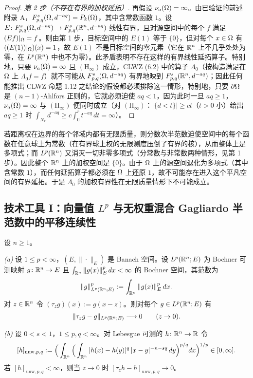 \begin{proof}
\emph{第 2 步（不存在有界的加权延拓）}. 再假设 $\nu_{a}(\Omega)=\infty$。由已验证的前述附录 A，$F^{s}_{p,q}(\Omega,d^{-aq})=P_k(\Omega)$，其中含常数函数 $1$。设 $E\colon F^{s}_{p,q}(\Omega,d^{-aq})\to F^{s}_{p,q}(\mathbb{R}^n,d^{-aq})$ 线性有界，且对源空间中的每个 $f$ 满足 $(Ef)|_\Omega=f$。则由第 1 步，目标空间中的 $E(1)$ 等于 $\{0\}$，但对每个 $x\in\Omega$ 有 $((E(1))|_\Omega)(x)=1$，故 $E(1)$ 不是目标空间的零元素（它在 $\mathbb{R}^n$ 上不几乎处处为零，在 $L^p(\mathbb{R}^n)$ 中也不为零）。此矛盾表明不存在这样的有界线性延拓算子。特别地，只要 $\nu_{a}(\Omega)=\infty$ 且 $\mathrm{(H_{\infty})}$ 成立，CLWZ (6.2) 中的算子 $\Lambda_0$（按构造满足在 $\Omega$ 上 $\Lambda_0f=f$）就不可能从 $F^{s}_{p,q}(\Omega,d^{-aq})$ 有界地映到 $F^{s}_{p,q}(\mathbb{R}^n,d^{-aq})$；因此任何能推出 CLWZ 命题 1.12 之结论的假设都必须排除这一情形，特别地，只要 $\partial\Omega$ 是 $(n-1)$-Ahlfors 正则的，它就必须迫使 $aq<1$，因为此时一旦 $aq\ge1$，$\nu_{a}(\Omega)=\infty$ 与 $\mathrm{(H_{\infty})}$ 便同时成立（对 $\mathrm{(H_{\infty})}$：$|\{d<t\}|\ge ct$（$t>0$ 小）给出 $aq\ge1$ 时 $\int_{N_r}d^{-aq}\ge c\int_0^rt^{-aq}\,dt=\infty$）。
\end{proof}

\begin{remark}[直觉]
若距离权在边界的每个邻域内都有无限质量，则分数次半范数迫使空间中的每个函数在任意球上为常数（在有界球上权的无限测度压倒了有界的核），从而整体上是多项式；而 $L^p(\mathbb{R}^n)$ 又消灭一切非零多项式（分常数与非常数两种情形，见第 1 步）。因此整个 $\mathbb{R}^n$ 上的加权空间是 $\{0\}$。由于 $\Omega$ 上的源空间退化为多项式（其中含常数 $1$），而任何延拓算子都必须在 $\Omega$ 上还原 $1$，故不可能存在进入这个平凡空间的有界延拓。于是 $\Lambda_0$ 的加权有界性在无限质量情形下不可能成立。
\end{remark}

\subsection{技术工具 I：向量值 \texorpdfstring{$L^p$}{Lp} 与无权重混合 Gagliardo 半范数中的平移连续性}

\begin{lemma}
设 $n\ge1$。

\emph{(a)} 设 $1\le p<\infty$，$(E,\|\cdot\|_E)$ 是 Banach 空间。设 $L^p(\mathbb{R}^n;E)$ 为 Bochner 可测映射 $g\colon\mathbb{R}^n\to E$ 且 $\int_{\mathbb{R}^n}\|g(x)\|_E^p\,dx<\infty$ 的 Bochner 空间，其范数为
\[
  \|g\|_{L^p(\mathbb{R}^n;E)}^p:=\int_{\mathbb{R}^n}\|g(x)\|_E^p\,dx.
\]
对 $z\in\mathbb{R}^n$ 令 $(\tau_zg)(x):=g(x-z)$。则对每个 $g\in L^p(\mathbb{R}^n;E)$ 有
\[
  \|\tau_zg-g\|_{L^p(\mathbb{R}^n;E)}\longrightarrow0\qquad(z\to0).
\]

\emph{(b)} 设 $0<s<1$，$1\le p,q<\infty$。对 Lebesgue 可测的 $h\colon\mathbb{R}^n\to\mathbb{R}$ 令
\[
  [h]_{\mathrm{unw},p,q}:=\Big(\int_{\mathbb{R}^n}\Big(\int_{\mathbb{R}^n}|h(x)-h(y)|^q\,|x-y|^{-n-sq}\,dy\Big)^{p/q}dx\Big)^{1/p}\in[0,\infty].
\]
若 $[h]_{\mathrm{unw},p,q}<\infty$，则当 $z\to0$ 时 $[\tau_zh-h]_{\mathrm{unw},p,q}\to0$。
\end{lemma}

